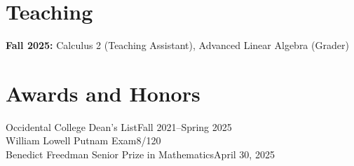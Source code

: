 \documentclass[margin, 12pt]{res} %
\begin{document}
\begin{resume}
\section{\sc Teaching}%
\textbf{Fall 2025:} Calculus 2 (Teaching Assistant), Advanced Linear Algebra (Grader)
\section{\sc Awards and Honors}
Occidental College Dean's List\hfill Fall 2021--Spring 2025\\
William Lowell Putnam Exam\hfill 8/120\\
Benedict Freedman Senior Prize in Mathematics\hfill April 30, 2025
\end{resume}
\end{document}
